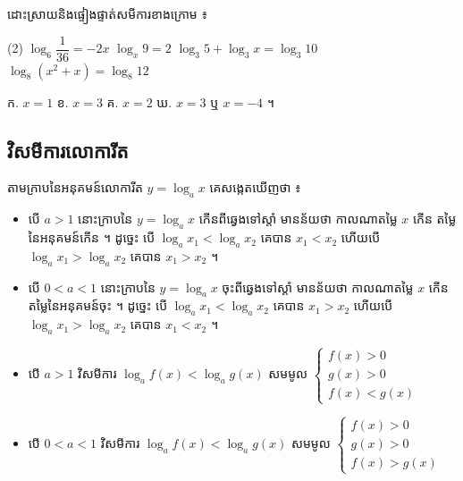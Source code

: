 \begin{pro}
ដោះស្រាយនិងផ្ទៀងផ្ទាត់សមីការខាងក្រោម ៖
\begin{tasks}(2)
  \task $\log_6\dfrac{1}{36} = -2x$
  \task $\log_x 9 = 2$
  \task $\log_3 5 + \log_3 x = \log_3 10$
  \task $\log_8(x^2 + x) = \log_8 12$
\end{tasks}
\ans
ក. $x = 1$ \quad ខ. $x = 3$ \quad គ. $x = 2$ \quad ឃ. $x = 3$ ឬ $x = -4$ ។
\end{pro}

\subsection{វិសមីការលោការីត}
តាមក្រាបនៃអនុគមន៍លោការីត $y = \log_a x$ គេសង្កេតឃើញថា ៖
\begin{itemize}
  \item បើ $a > 1$ នោះក្រាបនៃ $y = \log_a x$ កើនពីឆ្វេងទៅស្ដាំ មានន័យថា កាលណាតម្លៃ $x$ កើន តម្លៃនៃអនុគមន៍កើន ។ ដូច្នេះ បើ $\log_a x_1 < \log_a x_2$ គេបាន $x_1 < x_2$ ហើយបើ $\log_a x_1 > \log_a x_2$ គេបាន $x_1 > x_2$ ។
  \item បើ $0 < a < 1$ នោះក្រាបនៃ $y = \log_a x$ ចុះពីឆ្វេងទៅស្ដាំ មានន័យថា កាលណាតម្លៃ $x$ កើន តម្លៃនៃអនុគមន៍ចុះ ។ ដូច្នេះ បើ $\log_a x_1 < \log_a x_2$ គេបាន $x_1 > x_2$ ហើយបើ $\log_a x_1 > \log_a x_2$ គេបាន $x_1 < x_2$ ។
\end{itemize}

\begin{formulaBox}[ជាទូទៅ]
\begin{itemize}
  \item បើ $a > 1$ វិសមីការ $\log_a f(x) < \log_a g(x)$ សមមូល $\begin{cases} f(x) > 0\\ g(x) > 0\\ f(x) < g(x)\end{cases}$
  \item បើ $0 < a < 1$ វិសមីការ $\log_a f(x) < \log_a g(x)$ សមមូល $\begin{cases} f(x) > 0\\ g(x) > 0\\ f(x) > g(x)\end{cases}$
\end{itemize}
\end{formulaBox}

